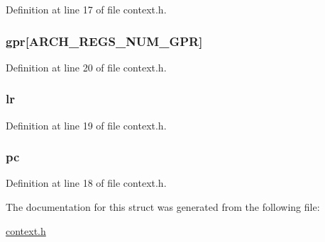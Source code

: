 \-Definition at line 17 of file context.\-h.

\hypertarget{structarch__regs_a3397c2bbf4a3049cf5bca2831ada10b8}{
\subsubsection[{gpr}]{ {\bf gpr}\mbox{[}{\bf \-A\-R\-C\-H\-\_\-\-R\-E\-G\-S\-\_\-\-N\-U\-M\-\_\-\-G\-P\-R}\mbox{]}}}\label{structarch__regs_a3397c2bbf4a3049cf5bca2831ada10b8}


\-Definition at line 20 of file context.\-h.

\hypertarget{structarch__regs_a6ced3f4007bb60daf12191c058e55b8c}{
\subsubsection[{lr}]{ {\bf lr}}}\label{structarch__regs_a6ced3f4007bb60daf12191c058e55b8c}


\-Definition at line 19 of file context.\-h.

\hypertarget{structarch__regs_afaa20335217fae16f0e22b466017dae1}{
\subsubsection[{pc}]{ {\bf pc}}}\label{structarch__regs_afaa20335217fae16f0e22b466017dae1}


\-Definition at line 18 of file context.\-h.



\-The documentation for this struct was generated from the following file\-:\begin{DoxyCompactItemize}
\item 
\hyperlink{context_8h}{context.\-h}\end{DoxyCompactItemize}
